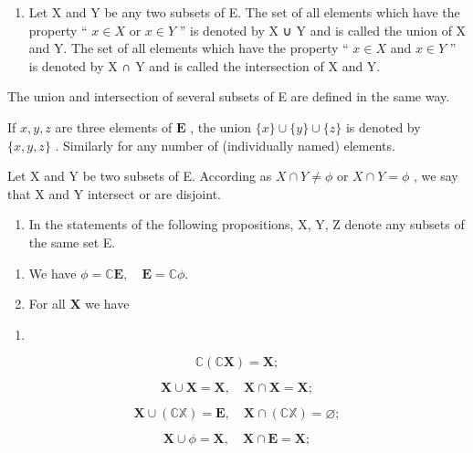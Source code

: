 \begin{enumerate}
\def\labelenumi{\arabic{enumi}.}
\setcounter{enumi}{12}
\tightlist
\item
  Let X and Y be any two subsets of E. The set of all elements which have the property `` \(x \in X\) or \(x \in Y\) '' is denoted by X ∪ Y and is called the union of X and Y. The set of all elements which have the property `` \(x \in X\) and \(x \in Y\) '' is denoted by X ∩ Y and is called the intersection of X and Y.
\end{enumerate}

The union and intersection of several subsets of E are defined in the same way.

If \(x, y, z\) are three elements of \(\mathbf{E}\) , the union \(\{x\} \cup \{y\} \cup \{z\}\) is denoted by \(\{x, y, z\}\) . Similarly for any number of (individually named) elements.

Let X and Y be two subsets of E. According as \(X \cap Y \neq \phi\) or \(X \cap Y = \phi\) , we say that X and Y intersect or are disjoint.

\begin{enumerate}
\def\labelenumi{\arabic{enumi}.}
\setcounter{enumi}{13}
\tightlist
\item
  In the statements of the following propositions, X, Y, Z denote any subsets of the same set E.
\end{enumerate}

\begin{enumerate}
\def\labelenumi{(\alph{enumi})}
\item
  We have \(\phi = \mathbb{C}\mathbf{E},\quad \mathbf{E} = \mathbb{C}\phi .\)
\item
  For all \(\mathbf{X}\) we have
\end{enumerate}

\begin{enumerate}
\def\labelenumi{(\arabic{enumi})}
\tightlist
\item
\end{enumerate}

\[
\mathbb {C} (\mathbb {C} \mathbf {X}) = \mathbf {X};\tag{2}
\]

\[
\mathbf {X} \cup \mathbf {X} = \mathbf {X}, \quad \mathbf {X} \cap \mathbf {X} = \mathbf {X};\tag{3}
\]

\[
\mathbf {X} \cup (\mathbb {C X}) = \mathbf {E}, \quad \mathbf {X} \cap (\mathbb {C X}) = \varnothing ;\tag{4}
\]

\[
\mathbf {X} \cup \phi = \mathbf {X}, \quad \mathbf {X} \cap \mathbf {E} = \mathbf {X};\tag{5}
\]

